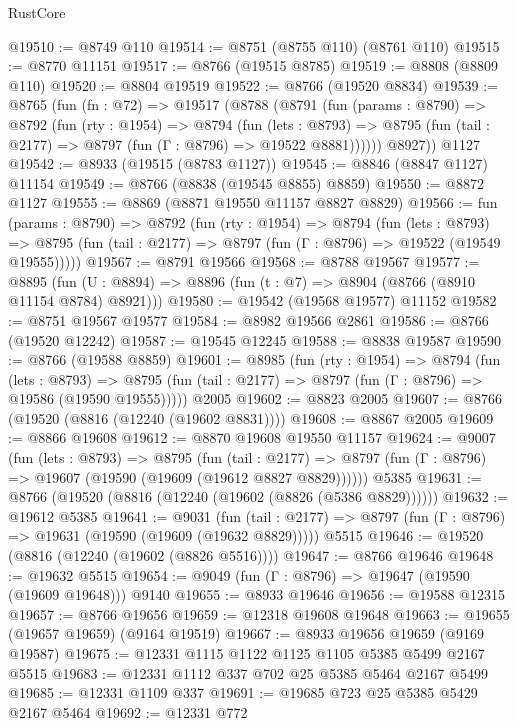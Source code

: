\begin{lexlean}{RustCore}
\begin{coremodule}
@19510 := @8749 @110
@19514 := @8751 (@8755 @110) (@8761 @110)
@19515 := @8770 @11151
@19517 := @8766 (@19515 @8785)
@19519 := @8808 (@8809 @110)
@19520 := @8804 @19519
@19522 := @8766 (@19520 @8834)
@19539 := @8765
    (fun (fn : @72) =>
    @19517
      (@8788
        (@8791
          (fun (params : @8790) =>
          @8792
            (fun (rty : @1954) =>
            @8794
              (fun (lets : @8793) =>
              @8795 (fun (tail : @2177) => @8797 (fun (Γ : @8796) => @19522 @8881))))))
        @8927))
    @1127
@19542 := @8933 (@19515 (@8783 @1127))
@19545 := @8846 (@8847 @1127) @11154
@19549 := @8766 (@8838 (@19545 @8855) @8859)
@19550 := @8872 @1127
@19555 := @8869 (@8871 @19550 @11157 @8827 @8829)
@19566 := fun (params : @8790) =>
  @8792
    (fun (rty : @1954) =>
    @8794
      (fun (lets : @8793) =>
      @8795 (fun (tail : @2177) => @8797 (fun (Γ : @8796) => @19522 (@19549 @19555)))))
@19567 := @8791 @19566
@19568 := @8788 @19567
@19577 := @8895
    (fun (U : @8894) => @8896 (fun (t : @7) => @8904 (@8766 (@8910 @11154 @8784) @8921)))
@19580 := @19542 (@19568 @19577) @11152
@19582 := @8751 @19567 @19577
@19584 := @8982 @19566 @2861
@19586 := @8766 (@19520 @12242)
@19587 := @19545 @12245
@19588 := @8838 @19587
@19590 := @8766 (@19588 @8859)
@19601 := @8985
    (fun (rty : @1954) =>
    @8794
      (fun (lets : @8793) =>
      @8795 (fun (tail : @2177) => @8797 (fun (Γ : @8796) => @19586 (@19590 @19555)))))
    @2005
@19602 := @8823 @2005
@19607 := @8766 (@19520 (@8816 (@12240 (@19602 @8831))))
@19608 := @8867 @2005
@19609 := @8866 @19608
@19612 := @8870 @19608 @19550 @11157
@19624 := @9007
    (fun (lets : @8793) =>
    @8795
      (fun (tail : @2177) =>
      @8797 (fun (Γ : @8796) => @19607 (@19590 (@19609 (@19612 @8827 @8829))))))
    @5385
@19631 := @8766 (@19520 (@8816 (@12240 (@19602 (@8826 (@5386 @8829))))))
@19632 := @19612 @5385
@19641 := @9031
    (fun (tail : @2177) => @8797 (fun (Γ : @8796) => @19631 (@19590 (@19609 (@19632 @8829)))))
    @5515
@19646 := @19520 (@8816 (@12240 (@19602 (@8826 @5516))))
@19647 := @8766 @19646
@19648 := @19632 @5515
@19654 := @9049 (fun (Γ : @8796) => @19647 (@19590 (@19609 @19648))) @9140
@19655 := @8933 @19646
@19656 := @19588 @12315
@19657 := @8766 @19656
@19659 := @12318 @19608 @19648
@19663 := @19655 (@19657 @19659) (@9164 @19519)
@19667 := @8933 @19656 @19659 (@9169 @19587)
@19675 := @12331 @1115 @1122 @1125 @1105 @5385 @5499 @2167 @5515
@19683 := @12331 @1112 @337 @702 @25 @5385 @5464 @2167 @5499
@19685 := @12331 @1109 @337
@19691 := @19685 @723 @25 @5385 @5429 @2167 @5464
@19692 := @12331 @772

\end{coremodule}
\end{lexlean}
